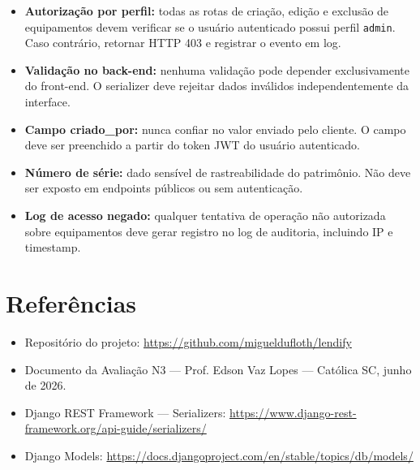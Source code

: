 \documentclass[12pt, a4paper]{article}
\begin{document}
\begin{itemize}
  \item \textbf{Autorização por perfil:} todas as rotas de criação, edição e exclusão
        de equipamentos devem verificar se o usuário autenticado possui perfil
        \texttt{admin}. Caso contrário, retornar HTTP 403 e registrar o evento em log.

  \item \textbf{Validação no back-end:} nenhuma validação pode depender exclusivamente
        do front-end. O serializer deve rejeitar dados inválidos independentemente
        da interface.

  \item \textbf{Campo criado\_por:} nunca confiar no valor enviado pelo cliente.
        O campo deve ser preenchido a partir do token JWT do usuário autenticado.

  \item \textbf{Número de série:} dado sensível de rastreabilidade do patrimônio.
        Não deve ser exposto em endpoints públicos ou sem autenticação.

  \item \textbf{Log de acesso negado:} qualquer tentativa de operação não autorizada
        sobre equipamentos deve gerar registro no log de auditoria, incluindo IP
        e timestamp.
\end{itemize}

\section{Referências}

\begin{itemize}
  \item Repositório do projeto: \url{https://github.com/migueldufloth/lendify}
  \item Documento da Avaliação N3 — Prof. Edson Vaz Lopes — Católica SC, junho de 2026.
  \item Django REST Framework — Serializers: \url{https://www.django-rest-framework.org/api-guide/serializers/}
  \item Django Models: \url{https://docs.djangoproject.com/en/stable/topics/db/models/}
\end{itemize}
\end{document}
